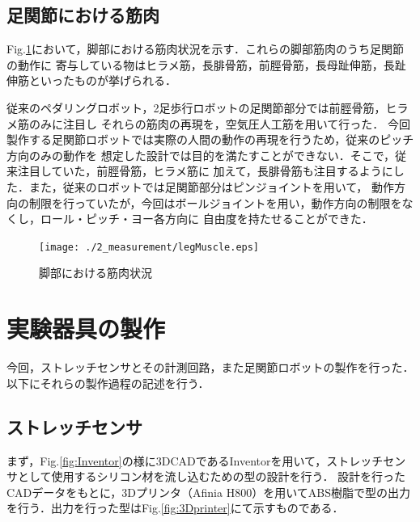 \newpage

\subsection{足関節における筋肉}
Fig.\ref{fig:legMuscle}において，脚部における筋肉状況を示す．これらの脚部筋肉のうち足関節の動作に
寄与している物はヒラメ筋，長腓骨筋，前脛骨筋，長母趾伸筋，長趾伸筋といったものが挙げられる．

従来のペダリングロボット，2足歩行ロボットの足関節部分では前脛骨筋，ヒラメ筋のみに注目し
それらの筋肉の再現を，空気圧人工筋を用いて行った．
今回製作する足関節ロボットでは実際の人間の動作の再現を行うため，従来のピッチ方向のみの動作を
想定した設計では目的を満たすことができない．そこで，従来注目していた，前脛骨筋，ヒラメ筋に
加えて，長腓骨筋も注目するようにした．また，従来のロボットでは足関節部分はピンジョイントを用いて，
動作方向の制限を行っていたが，今回はボールジョイントを用い，動作方向の制限をなくし，ロール・ピッチ・ヨー各方向に
自由度を持たせることができた．
\begin{figure}[h]
    \begin{center}
     \texttt{[image: ./2\_measurement/legMuscle.eps]}
     \caption{脚部における筋肉状況}
     \label{fig:legMuscle}
    \end{center}
\end{figure}

\newpage

\section{実験器具の製作}
今回，ストレッチセンサとその計測回路，また足関節ロボットの製作を行った．以下にそれらの製作過程の記述を行う．
\subsection{ストレッチセンサ}
まず，Fig.\ref{fig:Inventor}の様に3DCADであるInventorを用いて，ストレッチセンサとして使用するシリコン材を流し込むための型の設計を行う．
設計を行ったCADデータをもとに，3Dプリンタ（Afinia H800）を用いてABS樹脂で型の出力を行う．出力を行った型はFig.\ref{fig:3Dprinter}にて示すものである．

